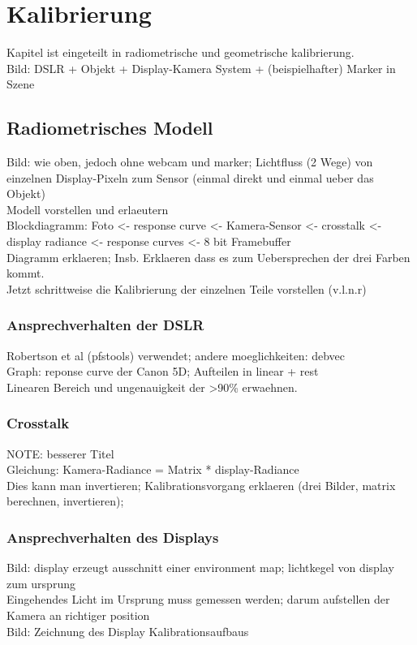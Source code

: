 \chapter{Kalibrierung}
  Kapitel ist eingeteilt in radiometrische und geometrische kalibrierung.\\
  Bild: DSLR + Objekt + Display-Kamera System + (beispielhafter) Marker in Szene\\
 
 \section{Radiometrisches Modell} 
 Bild: wie oben, jedoch ohne webcam  und marker; Lichtfluss (2 Wege) von einzelnen Display-Pixeln zum Sensor (einmal direkt und einmal ueber das Objekt)\\
 Modell vorstellen und erlaeutern\\
 Blockdiagramm: Foto <- response curve <- Kamera-Sensor <- crosstalk <- display radiance <- response curves <- 8 bit Framebuffer \\
  Diagramm erklaeren; Insb. Erklaeren dass es zum Uebersprechen der drei Farben kommt.\\ 
 Jetzt schrittweise die Kalibrierung der einzelnen Teile vorstellen (v.l.n.r)\\
 
 \subsection{Ansprechverhalten der DSLR} 
  Robertson et al (pfstools) verwendet; andere moeglichkeiten: debvec\\
  Graph: reponse curve der Canon 5D; Aufteilen in linear + rest\\
  Linearen Bereich und ungenauigkeit der >90\% erwaehnen.

 \subsection{Crosstalk} 
  NOTE: besserer Titel\\
  Gleichung: Kamera-Radiance = Matrix * display-Radiance \\
  Dies kann man invertieren; Kalibrationsvorgang erklaeren (drei Bilder, matrix berechnen, invertieren);
 
 \subsection{Ansprechverhalten des Displays}
  Bild: display erzeugt ausschnitt einer environment map; lichtkegel von display zum ursprung\\
  Eingehendes Licht im Ursprung muss gemessen werden; darum aufstellen der Kamera an richtiger position  \\
  Bild: Zeichnung des Display Kalibrationsaufbaus \\
  
